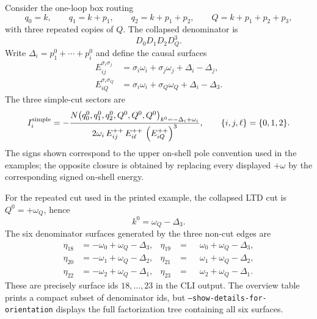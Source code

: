 \documentclass[11pt,a4paper]{report}
\begin{document}
Consider the one-loop box routing
\[
  q_0=k,\qquad q_1=k+p_1,\qquad q_2=k+p_1+p_2,\qquad
  Q=k+p_1+p_2+p_3,
\]
with three repeated copies of \(Q\).  The collapsed denominator is
\[
  D_0D_1D_2D_Q^3 .
\]
Write \(\Delta_i=p_1^0+\cdots+p_i^0\) and define the causal surfaces
\begin{align}
  E_{ij}^{\sigma_i\sigma_j}
  &=
  \sigma_i\omega_i+\sigma_j\omega_j+\Delta_i-\Delta_j,\\
  E_{iQ}^{\sigma_i\sigma_Q}
  &=
  \sigma_i\omega_i+\sigma_Q\omega_Q+\Delta_i-\Delta_3 .
\end{align}
The three simple-cut sectors are
\begin{equation}
  I_i^{\rm simple}
  =
  -\frac{
    N\!\left(
      q_0^0,q_1^0,q_2^0,Q^0,Q^0,Q^0
    \right)_{k^0=-\Delta_i+\omega_i}
  }{
    2\omega_i\,
    E_{ij}^{++}\,
    E_{i\ell}^{++}\,
    \left(E_{iQ}^{++}\right)^3
  },
  \qquad \{i,j,\ell\}=\{0,1,2\}.
  \label{eq:box-simple-cuts}
\end{equation}
The signs shown correspond to the upper on-shell pole convention used in the
examples; the opposite closure is obtained by replacing every displayed
\(+\omega\) by the corresponding signed on-shell energy.

For the repeated cut used in the printed example, the collapsed LTD cut is
\(Q^0=+\omega_Q\), hence
\[
  k^0=\omega_Q-\Delta_3 .
\]
The six denominator surfaces generated by the three non-cut edges are
\begin{align}
  \eta_{18}&=-\omega_0+\omega_Q-\Delta_3,&
  \eta_{19}&=\phantom{-}\omega_0+\omega_Q-\Delta_3,\\
  \eta_{20}&=-\omega_1+\omega_Q-\Delta_2,&
  \eta_{21}&=\phantom{-}\omega_1+\omega_Q-\Delta_2,\\
  \eta_{22}&=-\omega_2+\omega_Q-\Delta_1,&
  \eta_{23}&=\phantom{-}\omega_2+\omega_Q-\Delta_1 .
  \label{eq:box-b3-surfaces}
\end{align}
These are precisely surface ids \(18,\ldots,23\) in the CLI output.  The
overview table prints a compact subset of denominator ids, but
\texttt{--show-details-for-orientation} displays the full factorization tree
containing all six surfaces.
\end{document}
